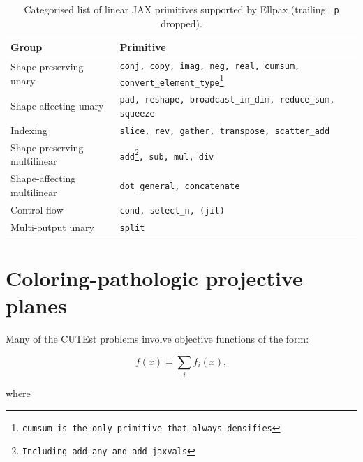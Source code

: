 \documentclass{article}
\begin{document}
\begin{table}
\centering
\caption{Categorised list of linear JAX primitives supported by Ellpax (trailing \texttt{\_p} dropped).}
\renewcommand{\arraystretch}{1.25}
\begin{tabularx}{0.85\textwidth}{lX}
\toprule
Group & Primitive \\
\midrule
Shape-preserving unary & \texttt{conj, copy, imag, neg, real, cumsum, convert\_element\_type\footnote{cumsum is the only primitive that always densifies}} \\
Shape-affecting unary & \texttt{pad, reshape, broadcast\_in\_dim, reduce\_sum, squeeze}  \\
Indexing & \texttt{slice, rev, gather, transpose, scatter\_add} \\
Shape-preserving multilinear & \texttt{add\footnote{Including add\_any and add\_jaxvals}, sub, mul, div} \\%
Shape-affecting multilinear & \texttt{dot\_general, concatenate} \\ %
Control flow & \texttt{cond, select\_n, (jit)}\\
Multi-output unary & \texttt{split} \\
\bottomrule
\end{tabularx}
\end{table}

\section{Coloring-pathologic projective planes}

Many of the CUTEst problems involve objective functions of the form:

\begin{equation}
f(x) = \sum_i f_i(x),
\end{equation}

where 




\end{document}
